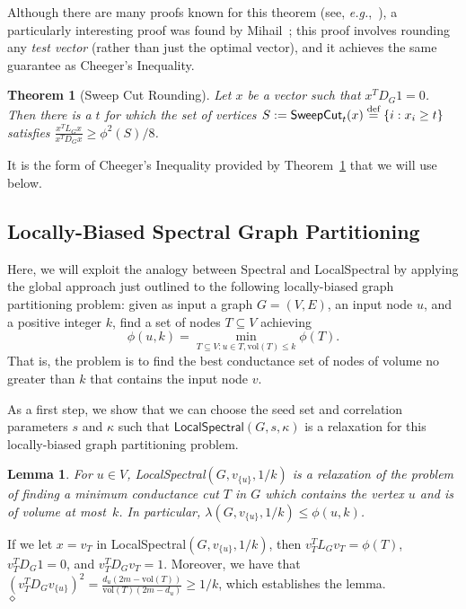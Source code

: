 \documentclass[11pt]{article}
\newtheorem{theorem}{Theorem}
\newtheorem{lemma}{Lemma}
\newenvironment{proof}{\noindent {\em Proof:}}{\\\hspace*{\fill}\mbox{$\diamond$}}
\newcommand{\defeq}{\stackrel{\textup{def}}{=}}
\newcommand{\vol}{\mathrm{vol}}
\begin{document}
\noindent
Although there are many proofs known for this theorem (see, 
\emph{e.g.},~\cite{Chung:1997}), a particularly interesting proof was 
found by Mihail~\cite{Mihail}; this proof involves rounding any \emph{test 
vector} (rather than just the optimal vector), and it achieves the same 
guarantee as Cheeger's Inequality. 
\begin{theorem}[Sweep Cut Rounding]
\label{thm:cheeger2}
Let $x$ be a vector such that $x^T D_G 1 =0$. Then there is a $t$ for which 
the set of vertices $S := \mathsf{SweepCut}_{t}(x) \defeq \{i: x_{i} \geq t \}$ 
satisfies $ \frac{ x^{T}L_{G}x}{x^{T}D_{G}x} \geq \phi^{2}(S)/8$.
\end{theorem}
It is the form of Cheeger's Inequality provided by Theorem~\ref{thm:cheeger2}
that we will use below.


\subsection{Locally-Biased Spectral Graph Partitioning}
\label{sxn:partition-local}

Here, we will exploit the analogy between \textsf{Spectral} and 
\textsf{LocalSpectral} by applying the global approach just outlined to the 
following locally-biased graph partitioning problem: 
given as input a graph $G=(V,E)$, an input node $u$, and a positive integer
$k$, find a set of nodes $T \subseteq V$ achieving
$$
\phi(u,k) = \min_{T \subseteq V: u\in T, \vol(T) \le k} \phi(T) .
$$
That is, the problem is to 
find the best conductance set of nodes of volume no greater 
than $k$ that contains the input node $v$. 

As a first step, we show that we can choose the seed set and correlation parameters $s$ and $\kappa$ such 
that $\textsf{LocalSpectral}(G,s,\kappa)$ is a relaxation for this 
locally-biased graph partitioning problem.
\begin{lemma}
\label{lem:relaxation}
For $u \in V$, \textsf{LocalSpectral}$(G,v_{\{u\}},1/k)$ is a relaxation 
of the problem of finding a minimum conductance cut $T$ in $G$ which 
contains the vertex $u$ and is of volume at most~$k$.  
In particular, $\lambda(G,v_{\{u\}},1/k) \leq \phi(u,k)$.
\end{lemma}
\begin{proof}
If we let $x=v_{T}$ in 
\textsf{LocalSpectral}$(G,v_{\{u\}},1/k)$, 
then $v_{T}^{T}L_{G}v_{T}=  \phi(T)$, $v_{T}^{T}D_{G}1=0$, and 
$v_{T}^{T}D_{G}v_{T}=1$.
Moreover, we have that 
$ (v_{T}^{T}D_{G}v_{\{u\}})^{2} = \frac{d_{u}(2m-\vol(T))}{\vol(T) (2m-d_{u})} \geq 1/k$,
which establishes the lemma. 
\end{proof}
\end{document}
